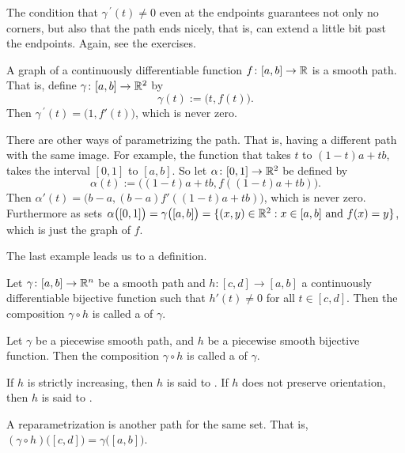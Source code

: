 The condition that $\gamma^{\:\prime}(t) \not= 0$ even at the endpoints guarantees
not only no corners, but also that the path ends nicely, that is, can
extend a little bit past the endpoints.  Again, see the exercises.

\begin{example}
A graph of a continuously differentiable function $f \colon [a,b] \to {\mathbb{R}}$ is a smooth path.
That is, define $\gamma \colon [a,b] \to {\mathbb{R}}^2$ by
\begin{equation*}
\gamma(t) := \bigl(t,f(t)\bigr) .
\end{equation*}
Then $\gamma^{\:\prime}(t) = \bigl( 1 , f'(t) \bigr)$, which is never zero.

There are other ways of parametrizing the path.  That is, having a
different path with the same image.  For example,
the function that takes $t$ to 
$(1-t)a+tb$, takes the interval $[0,1]$ to $[a,b]$.  So let
$\alpha \colon [0,1] \to {\mathbb{R}}^2$ be defined by
\begin{equation*}
\alpha(t) := \bigl((1-t)a+tb,f((1-t)a+tb)\bigr) .
\end{equation*}
Then
$\alpha'(t) = \bigl( b-a , (b-a)f'((1-t)a+tb) \bigr)$, which is never zero.
Furthermore as sets $\alpha\bigl([0,1]\bigr) = \gamma\bigl([a,b]\bigr)
= \{ (x,y) \in {\mathbb{R}}^2 : x \in [a,b] \text{ and } f(x) = y \}$,
which is just the graph of $f$.
\end{example}

The last example leads us to a definition.

\begin{defn}
Let $\gamma \colon [a,b] \to {\mathbb{R}}^n$ be a smooth path and
$h \colon [c,d] \to [a,b]$ a continuously differentiable bijective function
such that $h'(t) \not= 0$ for all $t \in [c,d]$.  Then
the composition
$\gamma \circ h$ is called a
\emph{}
of $\gamma$.

Let $\gamma$ be a piecewise smooth path,
and $h$ be a piecewise smooth bijective function.  Then
the composition
$\gamma \circ h$ is called a
\emph{} of $\gamma$.

If $h$ is strictly increasing, then $h$ is 
said to \emph{}.  If $h$ does not preserve
orientation, then $h$ is said to \emph{}.
\end{defn}

A reparametrization is another path for the same set.  That is,
$(\gamma \circ h)\bigl([c,d]\bigr) =
\gamma \bigl([a,b]\bigr)$.

